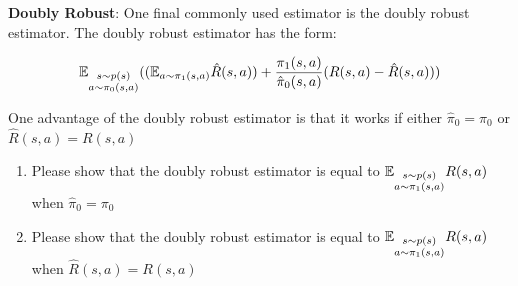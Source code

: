 \item  {} \textbf{Doubly Robust}: One final commonly used estimator is the doubly robust estimator. The doubly robust estimator has the form: 

$$\mathbb{E}_{\substack{s\sim p(s) \\ a \sim \pi_0(s, a)}}
(
(
\mathbb{E}_{\substack{a \sim \pi_1(s, a)}} \hat{R}(s, a)
) + 
\frac{\pi_1(s, a)}{\hat{\pi}_0(s, a)}  (R(s, a) - \hat{R}(s, a)))$$

One advantage of the doubly robust estimator is that it works if either $\hat{\pi}_0 = \pi_0$ or $\hat{R}(s, a) = R(s, a)$

\begin{enumerate}[label=\roman*.]
\item {} Please show that the doubly robust estimator is equal to $\mathbb{E}_{\substack{s\sim p(s) \\ a \sim \pi_1(s, a)}} R(s, a)$ when $\hat{\pi}_0 = \pi_0$
\item {} Please show that the doubly robust estimator is equal to $\mathbb{E}_{\substack{s\sim p(s) \\ a \sim \pi_1(s, a)}} R(s, a)$ when $\hat{R}(s, a) = R(s, a)$
\end{enumerate}
